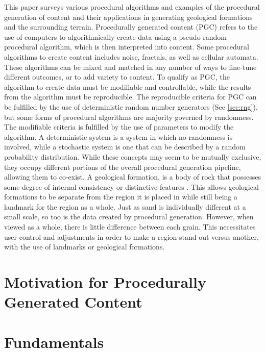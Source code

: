 \documentclass[10pt]{report}
\begin{document}
		This paper surveys various procedural algorithms and examples of the procedural generation of content and their applications in generating geological formations and the surrounding terrain. Procedurally generated content (PGC) refers to the use of computers to algorithmically create data using a pseudo-random procedural algorithm, which is then interpreted into content. Some procedural algorithms to create content includes noise, fractals, as well as cellular automata. These algorithms can be mixed and matched in any number of ways to fine-tune different outcomes, or to add variety to content. To qualify as PGC, the algorithm to create data must be modifiable and controllable, while the results from the algorithm must be reproducible. The reproducible criteria for PGC can be fulfilled by the use of deterministic random number generators (See \autoref{sec:rng}), but some forms of procedural algorithms are majority governed by randomness. The modifiable criteria is fulfilled by the use of parameters to modify the algorithm. A deterministic system is a system in which no randomness is involved, while a stochastic system is one that can be described by a random probability distribution. While these concepts may seem to be mutually exclusive, they occupy different portions of the overall procedural generation pipeline, allowing them to co-exist. A geological formation, is a body of rock that possesses some degree of internal consistency or distinctive features \cite{2005}. This allows geological formations to be separate from the region it is placed in while still being a landmark for the region as a whole. Just as sand is individually different at a small scale, so too is the data created by procedural generation. However, when viewed as a whole, there is little difference between each grain. This necessitates user control and adjustments in order to make a region stand out versus another, with the use of landmarks or geological formations.
		
		\section{Motivation for Procedurally Generated Content}
		
		\section{Fundamentals} \label{sec:rng}
		
\end{document}

